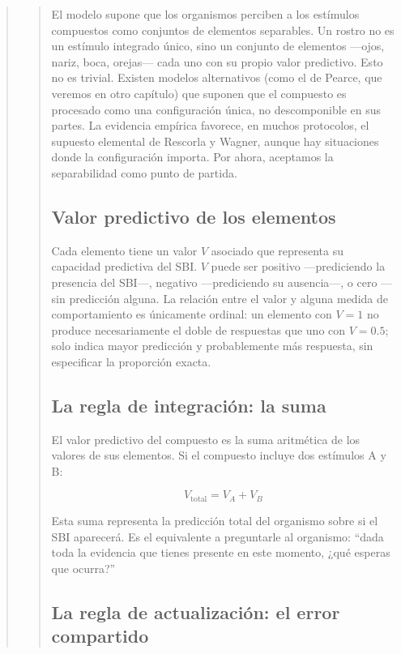 \documentclass[
  letterpaper,
  DIV=11,
  numbers=noendperiod]{scrreprt}
\begin{document}
\begin{tcolorbox}[enhanced jigsaw, toprule=.15mm, arc=.35mm, colback=white, opacityback=0, colframe=quarto-callout-note-color-frame, breakable, rightrule=.15mm, left=2mm, leftrule=.75mm, bottomrule=.15mm]
\begin{quote}
\begin{quote}
El modelo supone que los organismos perciben a los estímulos compuestos
como conjuntos de elementos separables. Un rostro no es un estímulo
integrado único, sino un conjunto de elementos ---ojos, nariz, boca,
orejas--- cada uno con su propio valor predictivo. Esto no es trivial.
Existen modelos alternativos (como el de Pearce, que veremos en otro
capítulo) que suponen que el compuesto es procesado como una
configuración única, no descomponible en sus partes. La evidencia
empírica favorece, en muchos protocolos, el supuesto elemental de
Rescorla y Wagner, aunque hay situaciones donde la configuración
importa. Por ahora, aceptamos la separabilidad como punto de partida.

\subsection{Valor predictivo de los
elementos}\label{valor-predictivo-de-los-elementos}

Cada elemento tiene un valor \(V\) asociado que representa su capacidad
predictiva del SBI. \(V\) puede ser positivo ---prediciendo la presencia
del SBI---, negativo ---prediciendo su ausencia---, o cero ---sin
predicción alguna. La relación entre el valor y alguna medida de
comportamiento es únicamente ordinal: un elemento con \(V = 1\) no
produce necesariamente el doble de respuestas que uno con \(V = 0.5\);
solo indica mayor predicción y probablemente más respuesta, sin
especificar la proporción exacta.

\subsection{La regla de integración: la
suma}\label{la-regla-de-integraciuxf3n-la-suma}

El valor predictivo del compuesto es la suma aritmética de los valores
de sus elementos. Si el compuesto incluye dos estímulos A y B:

\[V_{\text{total}} = V_A + V_B\]

Esta suma representa la predicción total del organismo sobre si el SBI
aparecerá. Es el equivalente a preguntarle al organismo: ``dada toda la
evidencia que tienes presente en este momento, ¿qué esperas que
ocurra?''

\subsection{La regla de actualización: el error
compartido}\label{la-regla-de-actualizaciuxf3n-el-error-compartido}


\end{quote}
\end{quote}
\end{tcolorbox}
\end{document}
